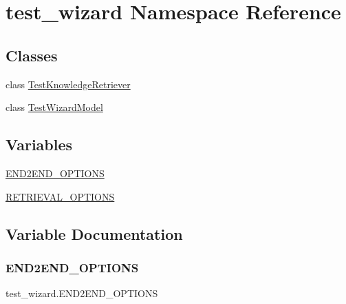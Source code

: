 \hypertarget{namespacetest__wizard}{}\section{test\+\_\+wizard Namespace Reference}
\label{namespacetest__wizard}
\subsection*{Classes}
\begin{DoxyCompactItemize}
\item 
class \hyperlink{classtest__wizard_1_1TestKnowledgeRetriever}{Test\+Knowledge\+Retriever}
\item 
class \hyperlink{classtest__wizard_1_1TestWizardModel}{Test\+Wizard\+Model}
\end{DoxyCompactItemize}
\subsection*{Variables}
\begin{DoxyCompactItemize}
\item 
\hyperlink{namespacetest__wizard_a0843d5d988bd8488a6650a21356fde21}{E\+N\+D2\+E\+N\+D\+\_\+\+O\+P\+T\+I\+O\+NS}
\item 
\hyperlink{namespacetest__wizard_afb087f070f016734182daff50be5d590}{R\+E\+T\+R\+I\+E\+V\+A\+L\+\_\+\+O\+P\+T\+I\+O\+NS}
\end{DoxyCompactItemize}


\subsection{Variable Documentation}
\mbox{\label{namespacetest__wizard_a0843d5d988bd8488a6650a21356fde21}} 
\subsubsection{\texorpdfstring{E\+N\+D2\+E\+N\+D\+\_\+\+O\+P\+T\+I\+O\+NS}{END2END\_OPTIONS}}
{\footnotesize\ttfamily test\+\_\+wizard.\+E\+N\+D2\+E\+N\+D\+\_\+\+O\+P\+T\+I\+O\+NS}




